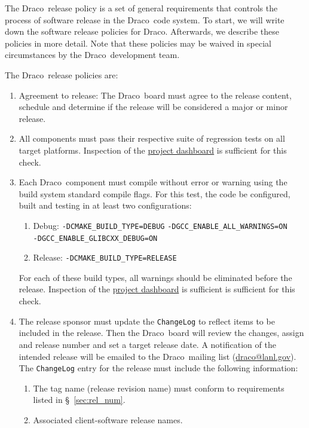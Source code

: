 \documentclass[note]{ResearchNote_pdf}
\newcommand{\draco}{{\normalfont\small\sffamily Draco}}
\begin{document}
The \draco\ release policy is a set of general requirements that
controls the process of software release in the \draco\ code system.
To start, we will write down the software release policies for \draco.
Afterwards, we describe these policies in more detail.  Note that
these policies may be waived in special circumstances by the
\draco\ development team.

The \draco\ release policies are:
\begin{enumerate}
\item Agreement to release: The \draco\ board must agree to the
  release content, schedule and determine if the release will be
  considered a major or minor release.
\item All components must pass their respective suite of regression
  tests on all target platforms.  Inspection of the
  \href{http://coder.lanl.gov/cdash}{project dashboard} is sufficient
  for this check.
\item Each \draco\ component must compile without error or warning
  using the build system standard compile flags.  For this test, the
  code be configured, built and testing in at least two
  configurations:
  \begin{enumerate}
  \item Debug: 
    \texttt{-DCMAKE\_BUILD\_TYPE=DEBUG} 
    \texttt{-DGCC\_ENABLE\_ALL\_WARNINGS=ON} \\
    \texttt{-DGCC\_ENABLE\_GLIBCXX\_DEBUG=ON} 
  \item Release: 
    \texttt{-DCMAKE\_BUILD\_TYPE=RELEASE}
  \end{enumerate}
  For each of these build types, all warnings should be eliminated
  before the release.  Inspection of the
  \href{http://coder.lanl.gov/cdash}{project dashboard} is sufficient
  is sufficient for this check.
\item The release sponsor must update the \texttt{ChangeLog} to
  reflect items to be included in the release.  Then the \draco\ board
  will review the changes, assign and release number and set a target
  release date. A notification of the intended release will be emailed
  to the \draco\ mailing list (\url{draco@lanl.gov}).  The
  \texttt{ChangeLog} entry for the release must include the following
  information:
  \begin{enumerate}
    \item The tag name (release revision name) must conform to
      requirements listed in \S~\ref{sec:rel_num}.
    \item Associated client-software release names.

\end{enumerate}
\end{enumerate}
\end{document}
